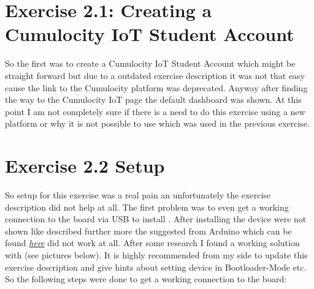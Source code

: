 \section{Exercise 2.1: Creating a Cumulocity IoT Student Account}
So the first was to create a Cumulocity IoT Student Account which might be straight forward but due to 
a outdated exercise description it was not that easy cause the link to the Cumulocity platform was deprecated.
Anyway after finding the way to the Cumulocity IoT page the default dashboard was shown. At this point I am 
not completely sure if there is a need to do this exercise using a new platform or why it is not possible to 
use  which was used in the previous exercise.


\section{Exercise 2.2 Setup}
So setup for this exercise was a real pain an unfortunately the exercise description did not help at all.
The first problem was to even get a working connection to the board via USB to install .
After installing  the device were not shown like described further more the 
suggested  from Arduino which can be found \href{https://labs.arduino.cc/en}{\textit{here}} 
did not work at all. After some research I found a working solution with  (see pictures below).
It is highly recommended from my side to update this exercise description and give hints about setting device 
in Bootloader-Mode etc.
\newline
\newline
So the following steps were done to get a working connection to the board:
